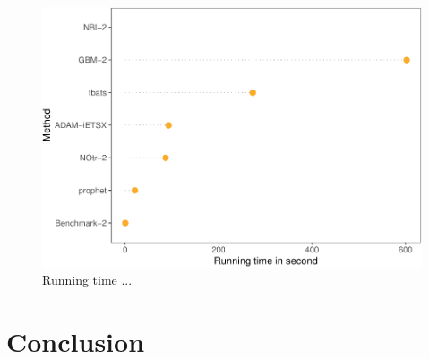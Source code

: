 \documentclass[]{elsarticle} %
\begin{document}
\begin{figure}[H]

{\centering \includegraphics[width=0.7\linewidth]{paper_files/figure-latex/time-1} 

}

\caption{Running time ...}\label{fig:time}
\end{figure}

\hypertarget{conclusion}{%
\section{Conclusion}\label{conclusion}}

\renewcommand\refname{References}

\end{document}
